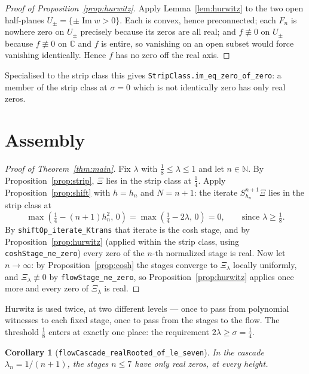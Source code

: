 \documentclass[11pt]{article}
\newtheorem{corollary}[theorem]{Corollary}
\theoremstyle{definition}
\DeclareMathOperator{\Imop}{Im}
\begin{document}
\begin{proof}[Proof of Proposition~\ref{prop:hurwitz}]
Apply Lemma~\ref{lem:hurwitz} to the two open half-planes $U_\pm=\{\pm\Imop w>0\}$.  Each is convex,
hence preconnected; each $F_n$ is nowhere zero on $U_\pm$ precisely because its zeros are all real; and
$f\not\equiv0$ on $U_\pm$ because $f\not\equiv0$ on $\mathbb C$ and $f$ is entire, so vanishing on an
open subset would force vanishing identically.  Hence $f$ has no zero off the real axis.
\end{proof}

Specialised to the strip class this gives \texttt{StripClass.im\_eq\_zero\_of\_zero}: a member of the
strip class at $\sigma=0$ which is not identically zero has only real zeros.

\section{Assembly}\label{sec:assembly}

\begin{proof}[Proof of Theorem~\ref{thm:main}]
Fix $\lambda$ with $\tfrac18\le\lambda\le1$ and let $n\in\mathbb N$.  By
Proposition~\ref{prop:strip}, $\Xi$ lies in the strip class at $\tfrac14$.  Apply
Proposition~\ref{prop:shift} with $h=h_n$ and $N=n+1$: the iterate $S_{h_n}^{n+1}\Xi$ lies in the
strip class at
\[
  \max\!\left(\tfrac14-(n{+}1)h_n^{2},\,0\right)=\max\!\left(\tfrac14-2\lambda,\,0\right)=0,
  \qquad\text{since }\lambda\ge\tfrac18 .
\]
By \texttt{shiftOp\_iterate\_Ktrans} that iterate is the cosh stage, and by
Proposition~\ref{prop:hurwitz} (applied within the strip class, using
\texttt{coshStage\_ne\_zero}) every zero of the $n$-th normalized stage is real.  Now let
$n\to\infty$: by Proposition~\ref{prop:cosh} the stages converge to $\Xi_\lambda$ locally uniformly,
and $\Xi_\lambda\not\equiv0$ by \texttt{flowStage\_ne\_zero}, so Proposition~\ref{prop:hurwitz} applies
once more and every zero of $\Xi_\lambda$ is real.
\end{proof}

Hurwitz is used twice, at two different levels --- once to pass from polynomial witnesses to each
fixed stage, once to pass from the stages to the flow.  The threshold $\tfrac18$ enters at exactly one
place: the requirement $2\lambda\ge\sigma=\tfrac14$.

\begin{corollary}[\texttt{flowCascade\_realRooted\_of\_le\_seven}]
In the cascade $\lambda_n=1/(n+1)$, the stages $n\le7$ have only real zeros, at every height.
\end{corollary}
\end{document}
